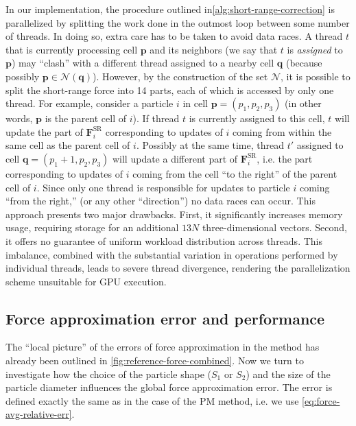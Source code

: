 In our implementation, the procedure outlined in\autoref{alg:short-range-correction} is parallelized by splitting the work done in the outmost loop between some number of threads.
In doing so, extra care has to be taken to avoid data races.
A thread $t$ that is currently processing cell $\mathbf{p}$ and its neighbors (we say that $t$ is \textit{assigned} to $\mathbf{p}$) may ``clash'' with a different thread assigned to a nearby cell $\mathbf{q}$ (because possibly $\mathbf{p} \in \mathcal{N}(\mathbf{q})$).
However, by the construction of the set $\mathcal{N}$, it is possible to split the short-range force into 14 parts, each of which is accessed by only one thread.
For example, consider a particle $i$ in cell $\mathbf{p} = (p_1, p_2, p_3)$ (in other words, $\mathbf{p}$ is the parent cell of $i$).
If thread $t$ is currently assigned to this cell, $t$ will update the part of $\mathbf{F}^\text{SR}_i$ corresponding to updates of $i$ coming from within the same cell as the parent cell of $i$.
Possibly at the same time, thread $t'$ assigned to cell $\mathbf{q} = (p_1+1, p_2, p_3)$ will update a different part of $\mathbf{F}^\text{SR}_i$, i.e. the part corresponding to updates of $i$ coming from the cell ``to the right'' of the parent cell of $i$.
Since only one thread is responsible for updates to particle $i$ coming ``from the right,'' (or any other ``direction'') no data races can occur.
This approach presents two major drawbacks.
First, it significantly increases memory usage, requiring storage for an additional $13N$ three-dimensional vectors.
Second, it offers no guarantee of uniform workload distribution across threads.
This imbalance, combined with the substantial variation in operations performed by individual threads, leads to severe thread divergence, rendering the parallelization scheme unsuitable for GPU execution.

\subsection{Force approximation error and performance}
The ``local picture'' of the errors of force approximation in the \PThreeM{} method has already been outlined in \autoref{fig:reference-force-combined}.
Now we turn to investigate how the choice of the particle shape ($S_1$ or $S_2$) and the size of the particle diameter influences the global force approximation error.
The error is defined exactly the same as in the case of the PM method, i.e. we use \autoref{eq:force-avg-relative-err}.

